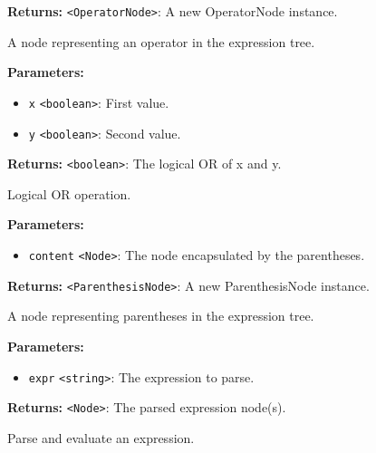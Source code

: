 \documentclass[12pt,a4paper]{article}
\begin{document}
\noindent \textbf{Returns:} \texttt{<OperatorNode>}: A new OperatorNode instance.

\noindent A node representing an operator in the expression tree.

\vspace{5mm}
\noindent {}


\noindent \textbf{Parameters:}
\begin{itemize}
  \item \texttt{x} \texttt{<boolean>}: First value.
  \item \texttt{y} \texttt{<boolean>}: Second value.
\end{itemize}

\noindent \textbf{Returns:} \texttt{<boolean>}: The logical OR of x and y.

\noindent Logical OR operation.

\vspace{5mm}
\noindent {}


\noindent \textbf{Parameters:}
\begin{itemize}
  \item \texttt{content} \texttt{<Node>}: The node encapsulated by the parentheses.
\end{itemize}

\noindent \textbf{Returns:} \texttt{<ParenthesisNode>}: A new ParenthesisNode instance.

\noindent A node representing parentheses in the expression tree.

\vspace{5mm}
\noindent {}


\noindent \textbf{Parameters:}
\begin{itemize}
  \item \texttt{expr} \texttt{<string>}: The expression to parse.
\end{itemize}

\noindent \textbf{Returns:} \texttt{<Node>}: The parsed expression node(s).

\noindent Parse and evaluate an expression.
\end{document}
